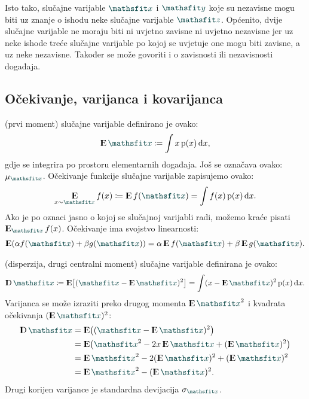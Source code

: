 \documentclass[utf8, diplomski, lmodern]{fer}
\begin{document}
Isto tako, slučajne varijable $\rvar x$ i $\rvar y$ koje su nezavisne mogu biti  uz znanje o ishodu neke slučajne varijable $\rvar z$. Općenito, dvije slučajne varijable ne moraju biti ni uvjetno zavisne ni uvjetno nezavisne jer uz neke ishode treće slučajne varijable po kojoj se uvjetuje one mogu biti zavisne, a uz neke nezavisne. Također se može govoriti i o zavisnosti ili nezavisnosti događaja.

\subsection{Očekivanje, varijanca i kovarijanca}

 (prvi moment) slučajne varijable definirano je ovako:
\begin{align}
\E\rvar x \coloneqq \int x\p(x)\dif x \text{,}
\end{align}
gdje se integrira po prostoru elementarnih događaja. Još se označava ovako: $\mu_{\rvar x}$. Očekivanje funkcije slučajne varijable zapisujemo ovako:
\begin{align}
\E_{x\sim\rvar x} f(x) \coloneqq \E f(\rvar x) = \int f(x)\p(x)\dif x \text{.}
\end{align}
Ako je po oznaci jasno o kojoj se slučajnoj varijabli radi, možemo kraće pisati $\E_{\rvar x} f(x)$. Očekivanje ima svojstvo linearnosti:
\begin{align}
\E\del{\alpha f(\rvar x)+\beta g(\rvar x)} = \alpha\E f(\rvar x)+\beta\E g(\rvar x) \text{.}
\end{align}

 (disperzija, drugi centralni moment) slučajne varijable definirana je ovako:
\begin{align}
\D\rvar x \coloneqq \E\sbr{\del{\rvar x-\E \rvar x}^2} = \int (x-\E \rvar x)^2 \p(x)\dif x \text{.}
\end{align}
Varijanca se može izraziti preko drugog momenta $\E{\rvar x}^2$ i kvadrata očekivanja $\del{\E\rvar x}^2$:
\begin{align}
\D\rvar x 
&= \E\del{\del{\rvar x-\E \rvar x}^2} \\
&= \E\del{{\rvar x}^2-2x\E \rvar x+\del{\E\rvar x}^2} \\
&= \E{\rvar x}^2-2\del{\E\rvar x}^2+\del{\E\rvar x}^2 \\
&= \E{\rvar x}^2 - \del{\E\rvar x}^2  \text{.} \label{eq:varijanca-izrazavanje-momenti}
\end{align}
Drugi korijen varijance je standardna devijacija $\sigma_{\rvar x}$.
\end{document}
